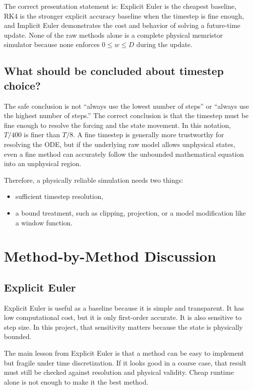 \documentclass[11pt]{article}
\begin{document}
The correct presentation statement is: Explicit Euler is the cheapest baseline, RK4 is the stronger explicit accuracy baseline when the timestep is fine enough, and Implicit Euler demonstrates the cost and behavior of solving a future-time update. None of the raw methods alone is a complete physical memristor simulator because none enforces \(0 \leq w \leq D\) during the update.

\subsection{What should be concluded about timestep choice?}

The safe conclusion is not ``always use the lowest number of steps'' or ``always use the highest number of steps.'' The correct conclusion is that the timestep must be fine enough to resolve the forcing and the state movement. In this notation, \(T/400\) is finer than \(T/8\). A fine timestep is generally more trustworthy for resolving the ODE, but if the underlying raw model allows unphysical states, even a fine method can accurately follow the unbounded mathematical equation into an unphysical region.

Therefore, a physically reliable simulation needs two things:
\begin{itemize}[noitemsep]
  \item sufficient timestep resolution,
  \item a bound treatment, such as clipping, projection, or a model modification like a window function.
\end{itemize}

\section{Method-by-Method Discussion}

\subsection{Explicit Euler}

Explicit Euler is useful as a baseline because it is simple and transparent. It has low computational cost, but it is only first-order accurate. It is also sensitive to step size. In this project, that sensitivity matters because the state is physically bounded.

The main lesson from Explicit Euler is that a method can be easy to implement but fragile under time discretization. If it looks good in a coarse case, that result must still be checked against resolution and physical validity. Cheap runtime alone is not enough to make it the best method.
\end{document}
